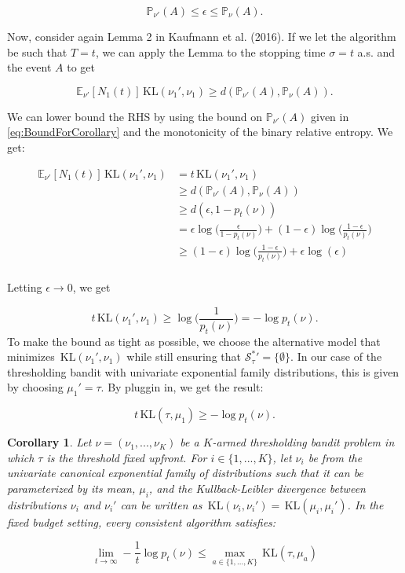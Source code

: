 \documentclass[12pt,]{article}
\newtheorem{corollary}{Corollary}
\newcommand{\KL}{\,\text{KL}}
\begin{document}
\begin{equation*}
\mathbb{P}_{\nu'}(A) \leq \epsilon \leq \mathbb{P}_{\nu}(A). \label{eq:BoundForCorollary}
\end{equation*}

Now, consider again Lemma 2 in Kaufmann et al. (2016). If we let the
algorithm be such that \(T = t\), we can apply the Lemma to the stopping
time \(\sigma = t\) a.s. and the event \(A\) to get

\[
\mathbb{E}_{\nu'}[N_1(t)]\KL(\nu_1', \nu_1) \geq d(\mathbb{P}_{\nu'}(A), \mathbb{P}_{\nu}(A)).
\]

We can lower bound the RHS by using the bound on
\(\mathbb{P}_{\nu'}(A)\) given in \eqref{eq:BoundForCorollary} and the
monotonicity of the binary relative entropy. We get:

\begin{align*}
\mathbb{E}_{\nu'}[N_1(t)]\KL(\nu_1', \nu_1) & = t \KL(\nu_1', \nu_1) \\
& \geq d(\mathbb{P}_{\nu'}(A), \mathbb{P}_{\nu}(A)) \\
& \geq d(\epsilon, 1- p_t(\nu)) \\
& = \epsilon \log\Big(\frac{\epsilon}{1-p_t(\nu)}\Big) + (1-\epsilon) \log \Big(\frac{1-\epsilon}{p_t(\nu)}\Big) \\
& \geq (1-\epsilon) \log \Big(\frac{1-\epsilon}{p_t(\nu)}\Big) + \epsilon \log(\epsilon) \\
\end{align*}

Letting \(\epsilon \rightarrow 0\), we get

\[
t \KL(\nu_1', \nu_1) \geq \log \Big(\frac{1}{p_t(\nu)}\Big) = -\log p_t(\nu).
\] To make the bound as tight as possible, we choose the alternative
model that minimizes \(\KL(\nu_1', \nu_1)\) while still ensuring that
\(\mathcal{S}_{\tau}^* {'} = \{\emptyset\}\). In our case of the
thresholding bandit with univariate exponential family distributions,
this is given by choosing \(\mu_1' = \tau\). By pluggin in, we get the
result:

\[
t \KL(\tau, \mu_1) \geq -\log p_t(\nu).
\]

\begin{corollary}
Let $\nu = (\nu_1, ..., \nu_K)$ be a $K$-armed thresholding bandit problem in which $\tau$ is the threshold fixed upfront. For $i \in \{1,...,K\}$, let $\nu_i$ be from the univariate canonical exponential family of distributions such that it can be parameterized by its mean, $\mu_i$, and the Kullback-Leibler divergence between distributions $\nu_i$ and $\nu_i'$ can be written as $\KL(\nu_i, \nu_i') = \KL(\mu_i, \mu_i')$. In the fixed budget setting, every consistent algorithm satisfies:

$$
\lim_{t \rightarrow \infty} -\frac{1}{t} \log p_t(\nu) \leq \max_{a \in \{1,...,K\}} \KL(\tau, \mu_a)
$$
\end{corollary}
\end{document}
